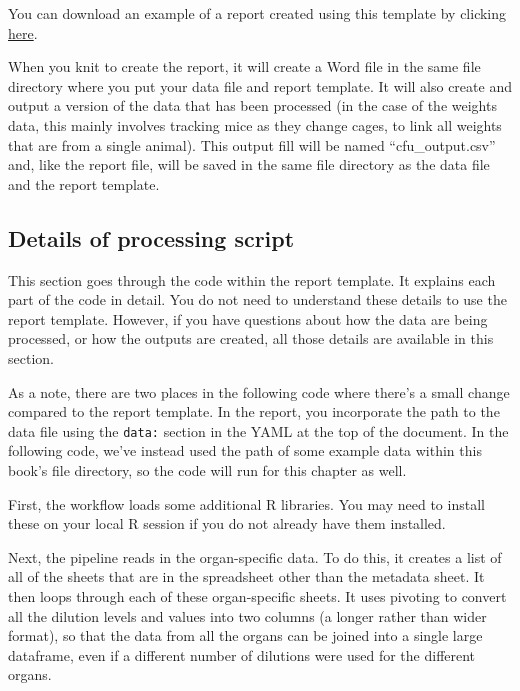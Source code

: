 \documentclass[
]{book}
\begin{document}
You can download an example of a report created using this template by
clicking \href{https://github.com/csu-impactb/CODING-TEAM-BOOKDOWN-/raw/main/templates/report_templates/cfu_report.docx}{here}.

When you knit to create the report, it will create a Word file in the
same file directory where you put your data file and report template.
It will also create and output a version of the data that has been
processed (in the case of the weights data, this mainly involves
tracking mice as they change cages, to link all weights that are from
a single animal). This output fill will be named ``cfu\_output.csv'' and, like
the report file, will be saved in the same file directory as the
data file and the report template.

\hypertarget{details-of-processing-script-1}{%
\subsection{Details of processing script}\label{details-of-processing-script-1}}

This section goes through the code within the report template. It
explains each part of the code in detail. You do not need to understand
these details to use the report template. However, if you have questions
about how the data are being processed, or how the outputs are created,
all those details are available in this section.

As a note, there are two places in the following code where there's a small
change compared to the report template. In the report, you incorporate the path
to the data file using the \texttt{data:} section in the YAML at the top of the
document. In the following code, we've instead used the path of some example
data within this book's file directory, so the code will run for this chapter as
well.

First, the workflow loads some additional R libraries. You may need to install
these on your local R session if you do not already have them installed.

Next, the pipeline reads in the organ-specific data. To do this, it creates a
list of all of the sheets that are in the spreadsheet other than the metadata
sheet. It then loops through each of these organ-specific sheets. It uses
pivoting to convert all the dilution levels and values into two columns
(a longer rather than wider format), so that the data from all the organs can
be joined into a single large dataframe, even if a different number of dilutions
were used for the different organs.
\end{document}
